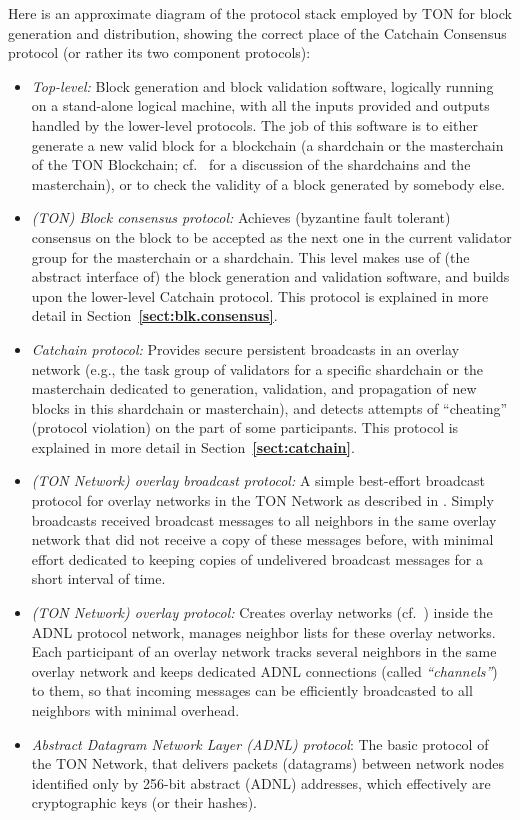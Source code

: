 \documentclass[12pt,oneside]{article}
\def\refpoint#1{{\rm\textbf{\ref{#1}}}}
\let\ptref=\refpoint
\begin{document}
Here is an approximate diagram of the protocol stack employed by TON for block generation and distribution, showing the correct place of the Catchain Consensus protocol (or rather its two component protocols):
\begin{itemize}
\item {\it Top-level:} Block generation and block validation software, logically running on a stand-alone logical machine, with all the inputs provided and outputs handled by the lower-level protocols. The job of this software is to either generate a new valid block for a blockchain (a shardchain or the masterchain of the TON Blockchain; cf.~\cite{TON} for a discussion of the shardchains and the masterchain), or to check the validity of a block generated by somebody else.
\item {\it (TON) Block consensus protocol:\/} Achieves (byzantine fault tolerant) consensus on the block to be accepted as the next one in the current validator group for the masterchain or a shardchain. This level makes use of (the abstract interface of) the block generation and validation software, and builds upon the lower-level Catchain protocol. This protocol is explained in more detail in Section~\ptref{sect:blk.consensus}.
\item {\it Catchain protocol:\/} Provides secure persistent broadcasts in an overlay network (e.g., the task group of validators for a specific shardchain or the masterchain dedicated to generation, validation, and propagation of new blocks in this shardchain or masterchain), and detects attempts of ``cheating'' (protocol violation) on the part of some participants. This protocol is explained in more detail in Section~\ptref{sect:catchain}.
\item {\it (TON Network) overlay broadcast protocol:\/} A simple best-effort broadcast protocol for overlay networks in the TON Network as described in \cite{TON}. Simply broadcasts received broadcast messages to all neighbors in the same overlay network that did not receive a copy of these messages before, with minimal effort dedicated to keeping copies of undelivered broadcast messages for a short interval of time.
\item {\it (TON Network) overlay protocol:\/} Creates overlay networks (cf.~\cite{TON}) inside the ADNL protocol network, manages neighbor lists for these overlay networks. Each participant of an overlay network tracks several neighbors in the same overlay network and keeps dedicated ADNL connections (called {\em ``channels''\/}) to them, so that incoming messages can be efficiently broadcasted to all neighbors with minimal overhead.
\item {\it Abstract Datagram Network Layer (ADNL) protocol\/}: The basic protocol of the TON Network, that delivers packets (datagrams) between network nodes identified only by 256-bit abstract (ADNL) addresses, which effectively are cryptographic keys (or their hashes).
\end{itemize}
\end{document}

